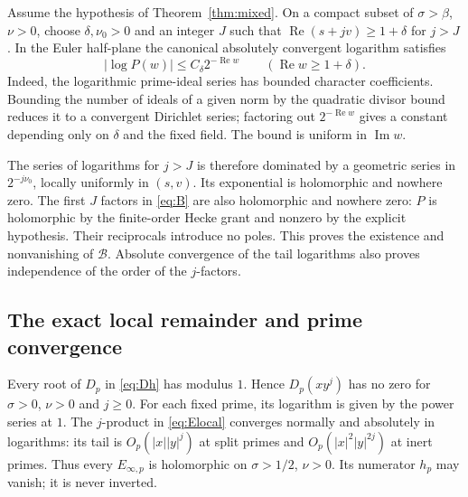 \documentclass[11pt]{article}
\numberwithin{equation}{section}
\newcommand{\B}{\mathcal B}
\newcommand{\Rea}{\operatorname{Re}}
\newcommand{\Ima}{\operatorname{Im}}
\begin{document}
Assume the hypothesis of Theorem~\ref{thm:mixed}. On a compact
subset of $\sigma>\beta$, $\nu>0$, choose $\delta,\nu_0>0$ and
an integer $J$ such that
$\Rea(s+jv)\ge1+\delta$ for $j>J$. In the Euler half-plane the
canonical absolutely convergent logarithm satisfies
\begin{equation}\label{eq:logP}
 |\log P(w)|\le C_\delta 2^{-\Rea w}
       \qquad(\Rea w\ge1+\delta).
\end{equation}
Indeed, the logarithmic prime-ideal series has bounded character
coefficients. Bounding the number of ideals of a given norm by
the quadratic divisor bound reduces it to a convergent Dirichlet
series; factoring out $2^{-\Rea w}$ gives a constant depending
only on $\delta$ and the fixed field. The bound is uniform in
$\Ima w$.

The series of logarithms for $j>J$ is therefore dominated by a
geometric series in $2^{-j\nu_0}$, locally uniformly in $(s,v)$.
Its exponential is holomorphic and nowhere zero. The first $J$
factors in \eqref{eq:B} are also holomorphic and nowhere zero:
$P$ is holomorphic by the finite-order Hecke grant and nonzero
by the explicit hypothesis. Their reciprocals introduce no poles.
This proves the existence and nonvanishing of $\B$. Absolute
convergence of the tail logarithms also proves independence of
the order of the $j$-factors.

\subsection{The exact local remainder and prime convergence}

Every root of $D_p$ in \eqref{eq:Dh} has modulus $1$.
Hence $D_p(xy^j)$ has no zero for $\sigma>0$, $\nu>0$ and $j\ge0$.
For each fixed prime, its logarithm is given by the power series
at $1$. The $j$-product in \eqref{eq:Elocal} converges normally
and absolutely in logarithms: its tail is
$O_p(|x||y|^j)$ at split primes and $O_p(|x|^2|y|^{2j})$ at inert
primes. Thus every $E_{\infty,p}$ is holomorphic on
$\sigma>1/2$, $\nu>0$. Its numerator $h_p$ may vanish; it is
never inverted.
\end{document}
